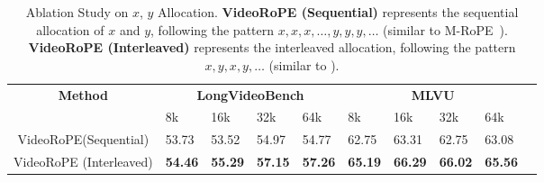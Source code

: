 \renewcommand{\arraystretch}{1.1}
\begin{table*}[!h]
\setlength\tabcolsep{5pt}
\centering
\captionsetup{width=0.9\textwidth}
\caption{Ablation Study on \(x\), \(y\) Allocation. \textbf{VideoRoPE (Sequential)} represents the sequential allocation of \(x\) and \(y\), following the pattern \(x, x, x, \dots, y, y, y, \dots\) (similar to M-RoPE~\cite{wang2024qwen2}). \textbf{VideoRoPE (Interleaved)} represents the interleaved allocation, following the pattern \(x, y, x, y, \dots\) (similar to \citet{agrawal2024pixtral12b}).}
\label{tab:ablation_x_y_allocation}
\vspace{2mm}
\normalsize
\begin{tabular}{clllllllll}
\hline
\multirow{2}{*}{\textbf{Method}}  & \multicolumn{4}{c}{\textbf{LongVideoBench}} & \multicolumn{4}{c}{\textbf{MLVU}} \\ 
\cmidrule(lr){2-5} %
\cmidrule(lr){6-9} %
 & 8k & 16k & 32k & 64k & 8k & 16k & 32k & 64k \\ \hline
VideoRoPE(Sequential) & 53.73 & 53.52 & 54.97 & 54.77 & 62.75 & 63.31 & 62.75 & 63.08  \\
\rowcolor[HTML]{F2F3F5} 
VideoRoPE (Interleaved) & {\textbf{54.46}} & \textbf{55.29} & {\textbf{57.15}} & {\textbf{57.26}} & {\textbf{65.19}} & \textbf{66.29} & {\textbf{66.02}} & {\textbf{65.56}} \\ \hline
\end{tabular}

\end{table*}

